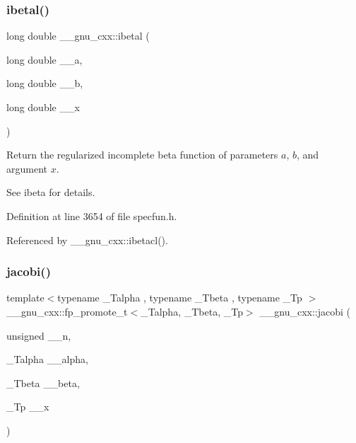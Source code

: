\subsubsection{\texorpdfstring{ibetal()}{ibetal()}}
{\footnotesize\ttfamily long double \+\_\+\+\_\+gnu\+\_\+cxx\+::ibetal (\begin{DoxyParamCaption}\item[{long double}]{\+\_\+\+\_\+a,  }\item[{long double}]{\+\_\+\+\_\+b,  }\item[{long double}]{\+\_\+\+\_\+x }\end{DoxyParamCaption})\hspace{0.3cm}{\ttfamily [inline]}}

Return the regularized incomplete beta function of parameters $ a $, $ b $, and argument $ x $.

See ibeta for details. 

Definition at line 3654 of file specfun.\+h.



Referenced by \+\_\+\+\_\+gnu\+\_\+cxx\+::ibetacl().

\mbox{\label{group__gnu__math__spec__func_gad54f6601748324d268532138eb38ca33}} 
\subsubsection{\texorpdfstring{jacobi()}{jacobi()}}
{\footnotesize\ttfamily template$<$typename \+\_\+\+Talpha , typename \+\_\+\+Tbeta , typename \+\_\+\+Tp $>$ \\
\+\_\+\+\_\+gnu\+\_\+cxx\+::fp\+\_\+promote\+\_\+t$<$\+\_\+\+Talpha, \+\_\+\+Tbeta, \+\_\+\+Tp$>$ \+\_\+\+\_\+gnu\+\_\+cxx\+::jacobi (\begin{DoxyParamCaption}\item[{unsigned}]{\+\_\+\+\_\+n,  }\item[{\+\_\+\+Talpha}]{\+\_\+\+\_\+alpha,  }\item[{\+\_\+\+Tbeta}]{\+\_\+\+\_\+beta,  }\item[{\+\_\+\+Tp}]{\+\_\+\+\_\+x }\end{DoxyParamCaption})\hspace{0.3cm}{\ttfamily [inline]}}


